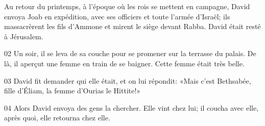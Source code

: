 Au retour du printemps, à l’époque où les rois se mettent en campagne, David envoya Joab en expédition, avec ses officiers et toute l’armée d’Israël; ils massacrèrent les fils d’Ammone et mirent le siège devant Rabba. David était resté à Jérusalem.

02 Un soir, il se leva de sa couche pour se promener sur la terrasse du palais. De là, il aperçut une femme en train de se baigner. Cette femme était très belle.

03 David fit demander qui elle était, et on lui répondit: «Mais c’est Bethsabée, fille d’Éliam, la femme d’Ourias le Hittite!»

04 Alors David envoya des gens la chercher. Elle vint chez lui; il coucha avec elle, après quoi, elle retourna chez elle.
